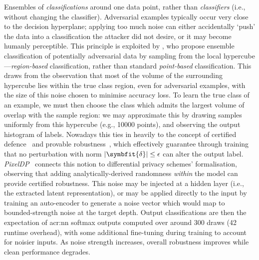 Ensembles of \emph{classifications} around one data point, rather than \emph{classifiers} (i.e., without changing the classifier).
Adversarial examples typically occur very close to the decision hyperplane; applying too much noise can either accidentally `push' the data into a classification the attacker did not desire, or it may become humanly perceptible.
This principle is exploited by \textcite{DBLP:conf/acsac/CaoG17}, who propose ensemble classification of potentially adversarial data by sampling from the local hypercube---\emph{region-based} classification, rather than standard \emph{point-based} classification.
This draws from the observation that most of the volume of the surrounding hypercube lies within the true class region, even for adversarial examples, with the size of this noise chosen to minimise accuracy loss.
To learn the true class of an example, we must then choose the class which admits the largest volume of overlap with the sample region: we may approximate this by drawing samples uniformly from this hypercube (e.g., \num{10000} points), and observing the output histogram of labels.
Nowadays this ties in heavily to the concept of certified defence~\parencite{DBLP:conf/iclr/RaghunathanSL18} and provable robustness~\parencite{DBLP:conf/iclr/ZhangCXGSLBH20}, which effectively guarantee through training that no perturbation with norm $|\symbfit{\delta}| \le \epsilon$ can alter the output label.
\emph{PixelDP}~\parencite{DBLP:conf/sp/LecuyerAG0J19} connects this notion to differential privacy schemes' formalisation, observing that adding analytically-derived randomness \emph{within} the model can provide certified robustness.
This noise may be injected at a hidden layer (i.e., the extracted latent representation), or may be applied directly to the input by training an auto-encoder to generate a noise vector which would map to bounded-strength noise at the target depth.
Output classifications are then the expectation of \gls{acr:nn} softmax outputs computed over around \num{300} draws (\qty{42}{\times} runtime overhead), with some additional fine-tuning during training to account for noisier inputs.
As noise strength increases, overall robustness improves while clean performance degrades.


